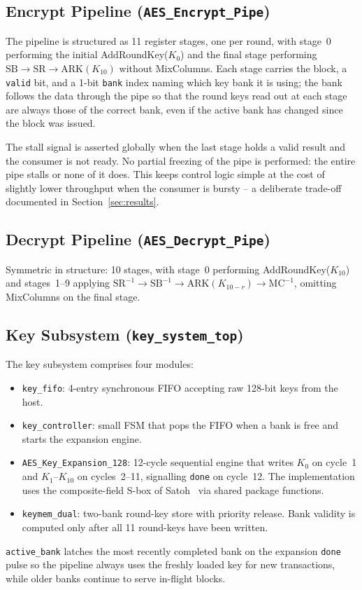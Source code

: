 \documentclass[conference,10pt,a4paper]{IEEEtran}
\begin{document}
\subsection{Encrypt Pipeline (\texttt{AES\_Encrypt\_Pipe})}
The pipeline is structured as 11 register stages, one per round, with
stage~0 performing the initial AddRoundKey($K_0$) and the final stage
performing $\mathrm{SB} \to \mathrm{SR} \to \mathrm{ARK}(K_{10})$ without
MixColumns.  Each stage carries the block, a \texttt{valid} bit, and a
1-bit \texttt{bank} index naming which key bank it is using; the bank
follows the data through the pipe so that the round keys read out at
each stage are always those of the correct bank, even if the active bank
has changed since the block was issued.

The stall signal is asserted globally when the last stage holds a valid
result and the consumer is not ready.  No partial freezing of the pipe
is performed: the entire pipe stalls or none of it does.  This keeps
control logic simple at the cost of slightly lower throughput when the
consumer is bursty -- a deliberate trade-off documented in
Section~\ref{sec:results}.

\subsection{Decrypt Pipeline (\texttt{AES\_Decrypt\_Pipe})}
Symmetric in structure: 10 stages, with stage~0 performing
AddRoundKey($K_{10}$) and stages~1--9 applying $\mathrm{SR}^{-1}
\to\mathrm{SB}^{-1} \to\mathrm{ARK}(K_{10-r}) \to\mathrm{MC}^{-1}$,
omitting MixColumns on the final stage.

\subsection{Key Subsystem (\texttt{key\_system\_top})}
The key subsystem comprises four modules:
\begin{itemize}[leftmargin=*]
  \item \texttt{key\_fifo}: 4-entry synchronous FIFO accepting raw
        128-bit keys from the host.
  \item \texttt{key\_controller}: small FSM that pops the FIFO when a
        bank is free and starts the expansion engine.
  \item \texttt{AES\_Key\_Expansion\_128}: 12-cycle sequential engine
        that writes $K_0$ on cycle~1 and $K_1$--$K_{10}$ on cycles~2--11,
        signalling \texttt{done} on cycle~12.  The implementation uses
        the composite-field S-box of Satoh~\cite{satoh} via shared
        package functions.
  \item \texttt{keymem\_dual}: two-bank round-key store with priority
        release.  Bank validity is computed only after all 11
        round-keys have been written.
\end{itemize}
\texttt{active\_bank} latches the most recently completed bank on the
expansion \texttt{done} pulse so the pipeline always uses the freshly
loaded key for new transactions, while older banks continue to serve
in-flight blocks.
\end{document}
